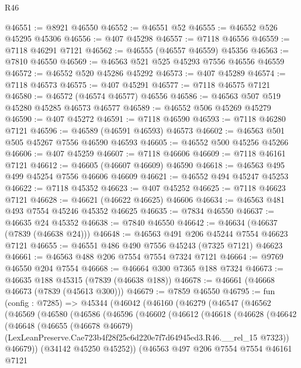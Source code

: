 \begin{lexlean}{R46}
\begin{coremodule}
@46551 := @8921 @46550
@46552 := @46551 @52
@46555 := @46552 @526 @45295 @45306
@46556 := @407 @45298
@46557 := @7118 @46556
@46559 := @7118 @46291 @7121
@46562 := @46555 (@46557 @46559) @45356
@46563 := @7810 @46550
@46569 := @46563 @521 @525 @45293 @7556 @46556 @46559
@46572 := @46552 @520 @45286 @45292
@46573 := @407 @45289
@46574 := @7118 @46573
@46575 := @407 @45291
@46577 := @7118 @46575 @7121
@46580 := @46572 (@46574 @46577) @46556
@46586 := @46563 @507 @519 @45280 @45285 @46573 @46577
@46589 := @46552 @506 @45269 @45279
@46590 := @407 @45272
@46591 := @7118 @46590
@46593 := @7118 @46280 @7121
@46596 := @46589 (@46591 @46593) @46573
@46602 := @46563 @501 @505 @45267 @7556 @46590 @46593
@46605 := @46552 @500 @45256 @45266
@46606 := @407 @45259
@46607 := @7118 @46606
@46609 := @7118 @46161 @7121
@46612 := @46605 (@46607 @46609) @46590
@46618 := @46563 @495 @499 @45254 @7556 @46606 @46609
@46621 := @46552 @494 @45247 @45253
@46622 := @7118 @45352
@46623 := @407 @45252
@46625 := @7118 @46623 @7121
@46628 := @46621 (@46622 @46625) @46606
@46634 := @46563 @481 @493 @7554 @45246 @45352 @46625
@46635 := @7834 @46550
@46637 := @46635 @24 @45352
@46638 := @7840 @46550
@46642 := @46634 (@46637 (@7839 (@46638 @24)))
@46648 := @46563 @491 @206 @45244 @7554 @46623 @7121
@46655 := @46551 @486 @490 @7556 @45243 (@7325 @7121) @46623
@46661 := @46563 @488 @206 @7554 @7554 @7324 @7121
@46664 := @9769 @46550 @204 @7554
@46668 := @46664 @300 @7365 @188 @7324
@46673 := @46635 @188 @45315 (@7839 (@46638 @188))
@46678 := @46661 (@46668 @46673 (@7839 (@45613 @300)))
@46679 := @7859 @46550
@46795 := fun (config : @7285) =>
  @45344
    (@46042
      (@46160
        (@46279
          (@46547
            (@46562
              (@46569
                (@46580
                  (@46586
                    (@46596
                      (@46602
                        (@46612
                          (@46618
                            (@46628
                              (@46642
                                (@46648
                                  (@46655
                                    (@46678 @46679)
                                    (LexLeanPreserve.Cae723b4f28f25c6d220e7f7d64945ed3.R46.__rel_15
                                      @7323))
                                  @46679))
                              (@34142 @45250 @45252))
                            (@46563
                              @497
                              @206
                              @7554
                              @7554
                              @46161
                              @7121

\end{coremodule}
\end{lexlean}
